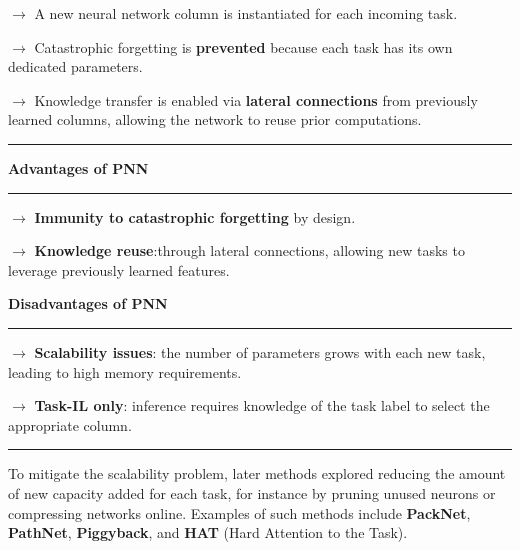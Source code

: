 $\rightarrow$ A new neural network column is instantiated for each incoming task.

$\rightarrow$ Catastrophic forgetting is \textbf{prevented} because each task has its own
dedicated parameters.

$\rightarrow$ Knowledge transfer is enabled via \textbf{lateral connections} from previously
learned columns, allowing the network to reuse prior computations.

\vspace{0.3cm}

\begin{center}
    \hrule
    \vspace{0.3cm}
    
    \begin{minipage}[t]{0.47\textwidth}
    \centering
    \textbf{Advantages of PNN}
    
    \vspace{0.2cm}
    \hrule
    \vspace{0.2cm}
    
    $\rightarrow$ \textbf{Immunity to catastrophic forgetting} by design.
    
    \vspace{0.15cm}
    
    $\rightarrow$ \textbf{Knowledge reuse}:through lateral connections, allowing new tasks to leverage
    previously learned features.
    
    \end{minipage}
    \hfill
    \begin{minipage}[t]{0.47\textwidth}
    \centering
    \textbf{Disadvantages of PNN}
    
    \vspace{0.2cm}
    \hrule
    \vspace{0.2cm}
    
    $\rightarrow$ \textbf{Scalability issues}: the number of parameters grows with each new task, leading
    to high memory requirements.
    
    \vspace{0.15cm}
    
    $\rightarrow$ \textbf{Task-IL only}: inference requires knowledge of the task label to select the
    appropriate column.
    
    \end{minipage}
    
    \vspace{0.3cm}
\hrule
\end{center}
\vspace{0.3cm}
To mitigate the scalability problem, later methods explored reducing the amount of new
capacity added for each task, for instance by pruning unused neurons or compressing
networks online. Examples of such methods include \textbf{PackNet}, \textbf{PathNet},
\textbf{Piggyback}, and \textbf{HAT} (Hard Attention to the Task).

